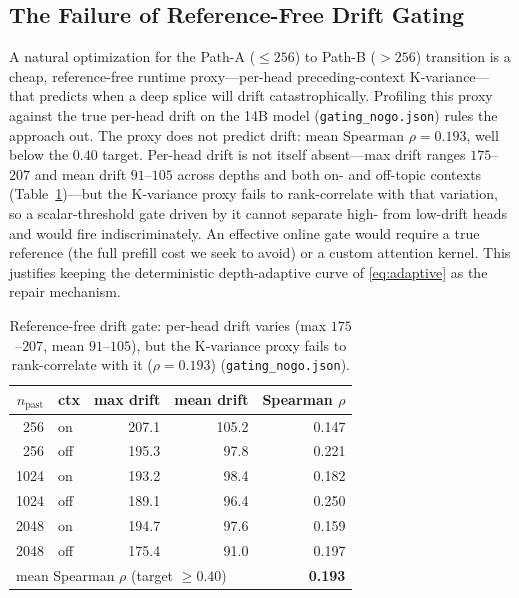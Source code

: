 \documentclass[10pt,conference]{IEEEtran}
\newcommand{\code}[1]{\texttt{\small #1}}
\begin{document}
\subsection{The Failure of Reference-Free Drift Gating}
\label{sec:gating}
A natural optimization for the Path-A ($\le 256$) to Path-B ($>256$) transition is a cheap,
reference-free runtime proxy---per-head preceding-context K-variance---that predicts when a deep
splice will drift catastrophically. Profiling this proxy against the true per-head drift on the
14B model (\code{gating\_nogo.json}) rules the approach out. The proxy does
not predict drift: mean Spearman $\rho=0.193$, well below the $0.40$ target. Per-head drift is not
itself absent---max drift ranges $175$--$207$ and mean drift $91$--$105$ across depths and both on-
and off-topic contexts (Table~\ref{tab:gating})---but the K-variance proxy fails to rank-correlate
with that variation, so a scalar-threshold gate driven by it cannot separate high- from low-drift
heads and would fire indiscriminately. An effective online gate would require a true
reference (the full prefill cost we seek to avoid) or a custom attention kernel. This justifies
keeping the deterministic depth-adaptive curve of \eqref{eq:adaptive} as the repair mechanism.

\begin{table}[t]
\centering
\caption{Reference-free drift gate: per-head drift varies (max $175$--$207$, mean $91$--$105$),
but the K-variance proxy fails to rank-correlate with it ($\rho=0.193$) (\code{gating\_nogo.json}).}
\label{tab:gating}
\small
\begin{tabular}{rlrrr}
\toprule
$n_{\mathrm{past}}$ & ctx & max drift & mean drift & Spearman $\rho$ \\
\midrule
256  & on  & 207.1 & 105.2 & 0.147 \\
256  & off & 195.3 &  97.8 & 0.221 \\
1024 & on  & 193.2 &  98.4 & 0.182 \\
1024 & off & 189.1 &  96.4 & 0.250 \\
2048 & on  & 194.7 &  97.6 & 0.159 \\
2048 & off & 175.4 &  91.0 & 0.197 \\
\midrule
\multicolumn{4}{l}{mean Spearman $\rho$ (target ${\ge}0.40$)} & \textbf{0.193} \\
\bottomrule
\end{tabular}
\end{table}

\end{document}
